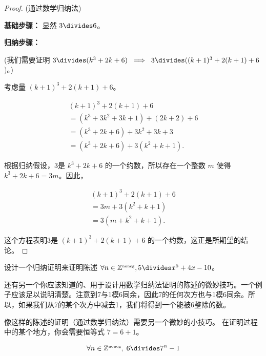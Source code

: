 \begin{proof}
(通过数学归纳法)

{\bf 基础步骤：} 显然 $3 \divides 6$。

{\bf 归纳步骤：}

\noindent (我们需要证明 $3 \divides (k^3 + 2k + 6) \; \implies \; 3 \divides ((k+1)^3 + 2(k+1) + 6$)。)

考虑量 $(k+1)^3 + 2(k+1) + 6$。

\begin{gather*}
   (k+1)^3 + 2(k+1) + 6 \\
 = (k^3 + 3k^2 + 3k + 1) + (2k + 2) + 6\\
 = (k^3 + 2k + 6) + 3k^2 + 3k + 3\\
 = (k^3 + 2k + 6) + 3(k^2 + k + 1).
\end{gather*}

根据归纳假设，3是 $k^3 + 2k + 6$ 的一个约数，所以存在一个整数 $m$ 使得 $k^3 + 2k + 6 = 3m$。因此，

\begin{gather*}
(k+1)^3 + 2(k+1) + 6 \\
= 3m + 3(k^2 + k + 1) \\
= 3(m + k^2 + k + 1).
\end{gather*}

这个方程表明3是 $(k+1)^3 + 2(k+1) + 6$ 的一个约数，这正是所期望的结论。
\end{proof}

\begin{exer}
设计一个归纳证明来证明陈述 $\forall n \in \Naturals, 5 \divides x^5+4x-10$。
\end{exer}

还有另一个你应该知道的、用于设计用数学归纳法证明的陈述的微妙技巧。一个例子应该足以说明清楚。注意到7与1模6同余，因此7的任何次方也与1模6同余。所以，如果我们从7的某个次方中减去1，我们将得到一个能被6整除的数。

像这样的陈述的证明（通过数学归纳法）需要另一个微妙的小技巧。
在证明过程中的某个地方，你会需要恒等式 $7=6+1$。

\begin{thm}
\[ \forall n \in \Naturals, \; 6 \divides 7^n-1 \]
\end{thm}

